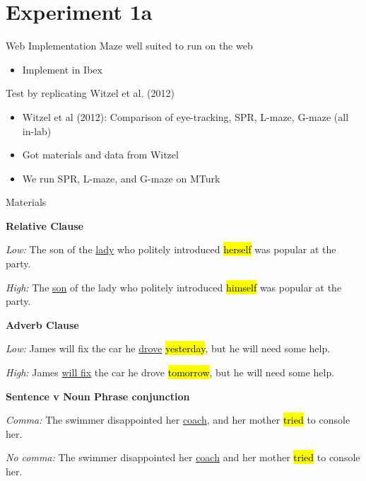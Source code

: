 \documentclass[12pt, xcolor=beamer,table,usenames,dvipsnames, ignorenonframetext, ngerman]{beamer}
\makeatletter
\let\HL\hl
\renewcommand\hl{%
	\let\set@color\beamerorig@set@color
	\let\reset@color\beamerorig@reset@color
	\HL}
\makeatother
\begin{document}
\section{Experiment 1a}
\begin{frame}{Web Implementation}
Maze well suited to run on the web
\begin{itemize}
	\item Implement in Ibex
\end{itemize} 
\pause

Test by replicating Witzel et al. (2012)
\begin{itemize}
	\item Witzel et al (2012): Comparison of eye-tracking, SPR, L-maze, G-maze (all in-lab)
	\item Got materials and data from Witzel
	\item We run SPR, L-maze, and G-maze on MTurk
\end{itemize}
\end{frame}

\begin{frame}{Materials}

\textbf{Relative Clause}

\textit{Low:} The son of the \uline{lady} who politely introduced \hl{herself} was popular at the party.

 \textit{High:} The \uline{son} of the lady who politely introduced \hl{himself} was popular at the party.
 

\textbf{Adverb Clause}

\textit{Low:} James will fix the car he \uline{drove} \hl{yesterday}, but he will need some help.

 \textit{High:} James \uline{will fix} the car he drove \hl{tomorrow}, but he will need some help.
		
\textbf{Sentence v Noun Phrase conjunction}

 \textit{Comma:} The swimmer disappointed her \uline{coach}, and her mother \hl{tried} to console her.

\textit{No comma:} The swimmer disappointed her \uline{coach} and her mother \hl{tried} to console her.
\end{frame}
\end{document}
